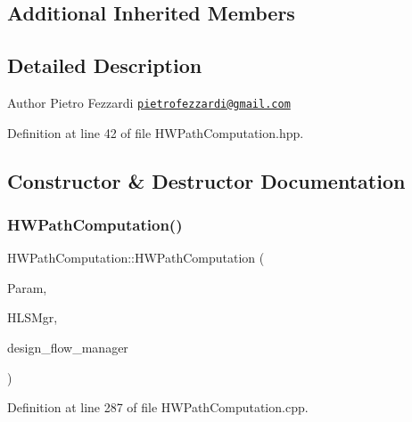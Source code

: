 \subsection*{Additional Inherited Members}


\subsection{Detailed Description}
\begin{DoxyAuthor}{Author}
Pietro Fezzardi \href{mailto:pietrofezzardi@gmail.com}{\tt pietrofezzardi@gmail.\+com} 
\end{DoxyAuthor}


Definition at line 42 of file H\+W\+Path\+Computation.\+hpp.



\subsection{Constructor \& Destructor Documentation}
\mbox{\label{classHWPathComputation_ad45b629abcebedfa77f1dd088e338ea8}} 
\subsubsection{\texorpdfstring{H\+W\+Path\+Computation()}{HWPathComputation()}}
{\footnotesize\ttfamily H\+W\+Path\+Computation\+::\+H\+W\+Path\+Computation (\begin{DoxyParamCaption}\item[{const \hyperlink{Parameter_8hpp_a37841774a6fcb479b597fdf8955eb4ea}{Parameter\+Const\+Ref}}]{Param,  }\item[{const \hyperlink{hls__manager_8hpp_acd3842b8589fe52c08fc0b2fcc813bfe}{H\+L\+S\+\_\+manager\+Ref}}]{H\+L\+S\+Mgr,  }\item[{const Design\+Flow\+Manager\+Const\+Ref}]{design\+\_\+flow\+\_\+manager }\end{DoxyParamCaption})}



Definition at line 287 of file H\+W\+Path\+Computation.\+cpp.

\mbox{\label{classHWPathComputation_a688fdb4a23c881a0dd23f6582182a637}} 
